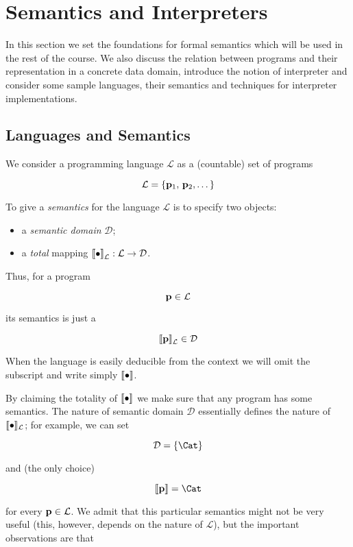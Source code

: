 \chapter{Semantics and Interpreters}

In this section we set the foundations for formal semantics which will be used in the rest of the course. We also discuss the
relation between programs and their representation in a concrete data domain, introduce the notion of interpreter and
consider some sample languages, their semantics and techniques for interpreter implementations.

\section{Languages and Semantics}

We consider a programming language $\mathcal L$ as a (countable) set of programs

\[
\mathcal{L}=\{\mathbf{p}_1,\,\mathbf{p}_2,\dots\}
\]

To give a \emph{semantics} for the language $\mathcal L$ is to specify two objects:

\begin{itemize}
\item a \emph{semantic domain} $\mathcal D$;
\item a \emph{total} mapping $\sembr{\bullet}^\ph_{\mathcal L} : \mathcal L \to \mathcal D$.
\end{itemize}

Thus, for a program

\[
\mathbf{p}\in\mathcal L
\]

its semantics is just a

\[
\sembr{\primi{p}}^\ph_{\mathcal L}\in\mathcal D
\]

When the language is easily deducible from the context we will omit the subscript and write simply $\llbracket{\bullet}\rrbracket$.

By claiming the totality of $\llbracket{\bullet}\rrbracket$ we
make sure that any program has some semantics. The nature of semantic domain $\mathcal D$ essentially defines the nature of $\llbracket{\bullet}\rrbracket_{\mathcal L}$;
for example, we can set

\[
\mathcal D=\{\Cat\}
\]

and (the only choice)

\[
\sembr{\primi{p}}=\Cat
\]

for every $\mathbf{p}\in\mathcal L$. We admit that this particular
semantics might not be very useful (this, however, depends on the nature of $\mathcal L$), but the important observations are that

